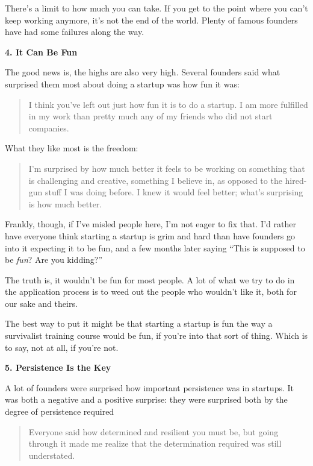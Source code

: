 There's a limit to how much you can take. If you get to the point where
you can't keep working anymore, it's not the end of the world. Plenty of
famous founders have had some failures along the way.

\textbf{4. It Can Be Fun}

The good news is, the highs are also very high. Several founders said
what surprised them most about doing a startup was how fun it was:

\begin{quote}
I think you've left out just how fun it is to do a startup. I am more
fulfilled in my work than pretty much any of my friends who did not
start companies.
\end{quote}

What they like most is the freedom:

\begin{quote}
I'm surprised by how much better it feels to be working on something
that is challenging and creative, something I believe in, as opposed to
the hired-gun stuff I was doing before. I knew it would feel better;
what's surprising is how much better.
\end{quote}

Frankly, though, if I've misled people here, I'm not eager to fix that.
I'd rather have everyone think starting a startup is grim and hard than
have founders go into it expecting it to be fun, and a few months later
saying ``This is supposed to be \emph{fun}? Are you kidding?''

The truth is, it wouldn't be fun for most people. A lot of what we try
to do in the application process is to weed out the people who wouldn't
like it, both for our sake and theirs.

The best way to put it might be that starting a startup is fun the way a
survivalist training course would be fun, if you're into that sort of
thing. Which is to say, not at all, if you're not.

\textbf{5. Persistence Is the Key}

A lot of founders were surprised how important persistence was in
startups. It was both a negative and a positive surprise: they were
surprised both by the degree of persistence required

\begin{quote}
Everyone said how determined and resilient you must be, but going
through it made me realize that the determination required was still
understated.
\end{quote}


